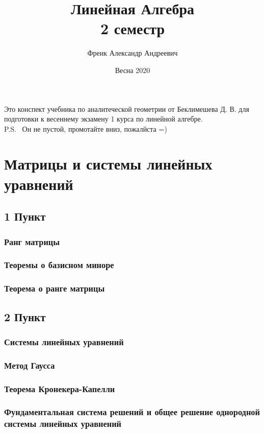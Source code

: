 \documentclass[11pt; a4paper]{report}
\theoremstyle{plain} %
\theoremstyle{defenition}
\theoremstyle{remark}
\begin{document}
 
\large
\title{Линейная Алгебра\\ 2 семестр}
\author{Фреик Александр Андреевич} 
\date{Весна 2020}
\maketitle
Это конспект учебника по аналитеческой геометрии от Беклимешева Д. В. для подготовки к весеннему экзамену 1 курса по линейной алгебре.\\ 
P.S.  Он не пустой, промотайте вниз, пожалйста =)
\tableofcontents

\newpage
\chapter{Матрицы и системы линейных уравнений}
\section{\Large 1 Пункт}
\subsection{Ранг матрицы}
\subsection{Теоремы о базисном миноре}
\subsection{Теорема о ранге матрицы}

\newpage
\section{\Large 2 Пункт}
\subsection{Системы линейных уравнений}
\subsection{Метод Гаусса}
\subsection{Теорема Кронекера-Капелли}
\subsection{Фундаментальная система решений и общее решение однородной системы линейных уравнений}
\end{document}
